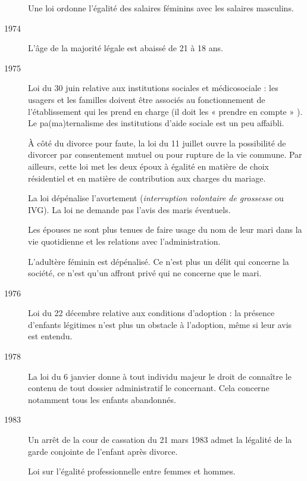 \begin{description}
Une loi ordonne l'égalité des salaires féminins avec les salaires masculins.

\item[1974] L'âge de la majorité légale est abaissé de 21 à 18 ans. 

\item[1975] Loi du 30 juin relative aux institutions sociales et médicosociale : les usagers et les familles doivent être associés au fonctionnement de l'établissement qui les prend en charge (il doit les « prendre en compte » ).  Le pa(ma)ternalisme des institutions d'aide sociale est un peu affaibli.

À côté du divorce pour faute, la loi du 11 juillet ouvre la possibilité de divorcer par consentement mutuel ou pour rupture de la vie commune. Par ailleurs, cette loi met les deux époux à égalité en matière de choix résidentiel et en matière de contribution aux charges du mariage.

La loi  dépénalise l'avortement (\emph{interruption volontaire de grossesse} ou IVG). La loi ne demande pas l'avis des maris éventuels.

Les épouses ne sont plus tenues de faire usage du nom de leur mari dans la vie quotidienne et les relations avec l'administration.

L'adultère féminin est dépénalisé. Ce n'est plus un délit qui concerne la société, ce n'est qu'un affront privé qui ne concerne que le mari.

\item[1976] Loi du 22 décembre relative aux conditions d'adoption : la présence d'enfants légitimes n'est plus un obstacle à l'adoption, même si leur avis est entendu. 

\item[1978] La loi du 6 janvier donne à tout individu majeur le droit de connaître le contenu de tout dossier administratif le concernant. Cela concerne notamment tous les enfants abandonnés.

\item[1983] Un arrêt de la cour de cassation du 21 mars 1983 admet la légalité de la garde conjointe de l'enfant après divorce.

Loi sur l'égalité professionnelle entre femmes et hommes.


\end{description}
